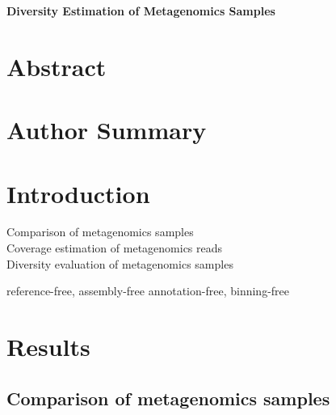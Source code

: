 \documentclass[10pt]{article}
\date{}
\begin{document}
\begin{flushleft}
{\Large
\textbf{Diversity Estimation of Metagenomics Samples}
}
\end{flushleft}


\section*{Abstract}



\section*{Author Summary}

\section*{Introduction}
Comparison of metagenomics samples
\\
Coverage estimation of metagenomics reads
\\
Diversity evaluation of metagenomics samples

reference-free, assembly-free annotation-free, binning-free

\section*{Results}

\subsection*{Comparison of metagenomics samples}
\end{document}
